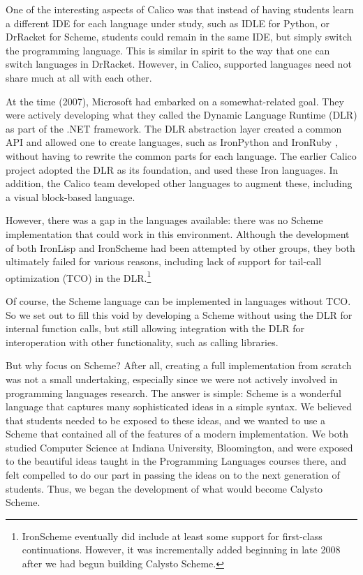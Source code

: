 \documentclass[acmsmall,screen,anonymous,review]{acmart}
\begin{document}
One of the interesting aspects of Calico was that instead of having
students learn a different IDE for each language under study, such as
IDLE for Python, or DrRacket for Scheme, students could remain in the
same IDE, but simply switch the programming language. This is similar
in spirit to the way that one can switch languages in
DrRacket. However, in Calico, supported languages need not share much
at all with each other.

At the time (2007), Microsoft had embarked on a somewhat-related goal. They
were actively developing what they called the Dynamic Language Runtime (DLR) as
part of the .NET framework. The DLR abstraction layer created a common API and
allowed one to create languages, such as IronPython and IronRuby
\cite{IronRuby}, without having to rewrite the common parts for each
language. The earlier Calico project adopted the DLR as its foundation, and used these
Iron languages. In addition, the Calico team developed other languages to
augment these, including a visual block-based language.

However, there was a gap in the languages available: there was no
Scheme implementation that could work in this environment. Although
the development of both IronLisp and IronScheme \cite{IronScheme} had
been attempted by other groups, they both ultimately failed for
various reasons, including lack of support for tail-call optimization
(TCO) in the DLR.\footnote[1]{IronScheme eventually did include at
least some support for first-class continuations. However, it was
incrementally added beginning in late 2008
\cite{IronScheme-Continuations} after we had begun building Calysto
Scheme.}

Of course, the Scheme language can be implemented in languages without
TCO. So we set out to fill this void by developing a Scheme without
using the DLR for internal function calls, but still allowing
integration with the DLR for interoperation with other functionality,
such as calling libraries.

But why focus on Scheme? After all, creating a full implementation from scratch
was not a small undertaking, especially since we were not actively involved in
programming languages research. The answer is simple: Scheme is a wonderful
language that captures many sophisticated ideas in a simple syntax. We believed
that students needed to be exposed to these ideas, and we wanted to use a
Scheme that contained all of the features of a modern implementation. We both
studied Computer Science at Indiana University, Bloomington, and were exposed
to the beautiful ideas taught in the Programming Languages courses there, and
felt compelled to do our part in passing the ideas on to the next generation of
students. Thus, we began the development of what would become Calysto Scheme.
\end{document}
